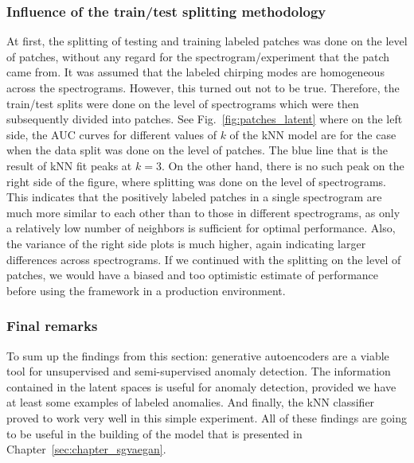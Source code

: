 \subsubsection{Influence of the train/test splitting methodology}
At first, the splitting of testing and training labeled patches was done on the level of patches, without any regard for the spectrogram/experiment that the patch came from. It was assumed that the labeled chirping modes are homogeneous across the spectrograms. However, this turned out not to be true. Therefore, the train/test splits were done on the level of spectrograms which were then subsequently divided into patches. See Fig.~\ref{fig:patches_latent} where on the left side, the AUC curves for different values of $k$ of the kNN model are for the case when the data split was done on the level of patches. The blue line that is the result of kNN fit peaks at $k=3$. On the other hand, there is no such peak on the right side of the figure, where splitting was done on the level of spectrograms. This indicates that the positively labeled patches in a single spectrogram are much more similar to each other than to those in different spectrograms, as only a relatively low number of neighbors is sufficient for optimal performance. Also, the variance of the right side plots is much higher, again indicating larger differences across spectrograms. If we continued with the splitting on the level of patches, we would have a biased and too optimistic estimate of performance before using the framework in a production environment.

\subsubsection{Final remarks}
To sum up the findings from this section: generative autoencoders are a viable tool for unsupervised and semi-supervised anomaly detection. The information contained in the latent spaces is useful for anomaly detection, provided we have at least some examples of labeled anomalies. And finally, the kNN classifier proved to work very well in this simple experiment. All of these findings are going to be useful in the building of the model that is presented in Chapter~\ref{sec:chapter_sgvaegan}. 